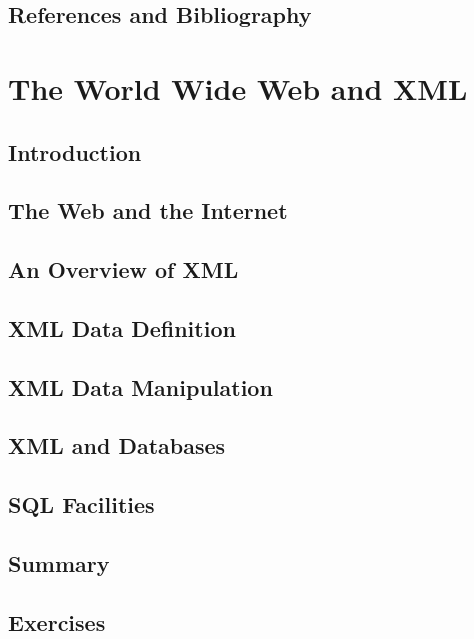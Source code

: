 \documentclass{book}
\begin{document}
\section{References and Bibliography}













\chapter{The World Wide Web and XML}

\section{Introduction}

\section{The Web and the Internet}

\section{An Overview of XML}

\section{XML Data Definition}

\section{XML Data Manipulation}

\section{XML and Databases}

\section{SQL Facilities}

\section{Summary}

\section{Exercises}
\end{document}
